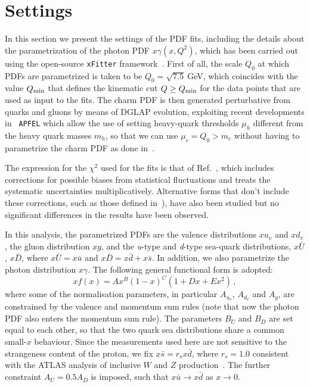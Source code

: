 \section{Settings}
\label{sec:fitsettings}

In this section we present the settings of the PDF fits, including the details about the
parametrization of the photon PDF $x\gamma(x,Q^2)$, which has been
carried out using the open-source {\tt xFitter}
framework~\cite{Alekhin:2014irh}.
%
First of all, the scale $Q_0$ at which PDFs are parametrized is taken to be
$Q_0 = \sqrt{7.5}~$GeV, which coincides with the value $Q_{\rm min}$ that defines
the kinematic cut $Q \ge Q_{\rm min}$ for the
data points that are used as input to the fits.
%
The charm PDF is then generated perturbative from quarks and gluons by
means of DGLAP evolution, exploiting recent developments in {\tt
  APFEL} which allow the use of setting heavy-quark thresholds $\mu_h$
different from the heavy quark masses $m_h$, so that we can use
$\mu_c=Q_0 > m_c$ without having to parametrize the charm PDF as done in~\cite{Ball:2016neh}.

The expression for the $\chi^2$ used for the fits is that
of Ref.~\cite{Aaron:2012qi}, which
includes corrections for possible 
biases from statistical fluctuations and treats the systematic uncertainties
multiplicatively.
%
Alternative forms that don't include these corrections, such as those
defined in~\cite{Aaron:2009aa,Abramowicz:2015mha}),
have also been studied but no significant differences
in the results have been observed.
%

In this analysis, the parametrized PDFs are the valence distributions
$xu_{v}$ and $xd_{v}$, the gluon distribution $xg$, and the
\textit{u}-type and \textit{d}-type sea-quark distributions,
$x\bar{U}$, $x\bar{D}$, where $x\bar{U} = x\bar{u}$ and
$x\bar{D} = x\bar{d} + x\bar{s}$.
%
In addition, we also parametrize the photon distribution $x\gamma$.
%
The following general functional form is adopted:
\begin{equation}
  \label{eq:parametrization}
xf(x) = Ax^{B}(1-x)^{C}(1+Dx+Ex^{2}) \, ,
\end{equation}
where some of the normalisation parameters, in particular $A_{u_{v}}$,
$A_{d_{v}}$ and $A_{g}$, are constrained by the valence and momentum
sum rules (note that now the photon PDF also enters the momentum sum rule).
%
The parameters $B_{\bar{U}}$ and $B_{\bar{D}}$ are set equal to each
other, so that the two quark sea distributions share a common
small-$x$ behaviour.
%
Since the measurements used here are not sensitive to the strangeness
content of the proton, we fix $x\bar{s} = r_sx\bar{d}$, where
$r_s=1.0$ consistent with the ATLAS analysis of inclusive $W$
and $Z$ production~\cite{Aad:2012sb,Aaboud:2016btc}.
%
The further constraint $A_{\bar{U}} = 0.5 A_{\bar{D}}$ is imposed,
such that $x\bar{u} \to x\bar{d}$ as $x \to 0$.  

